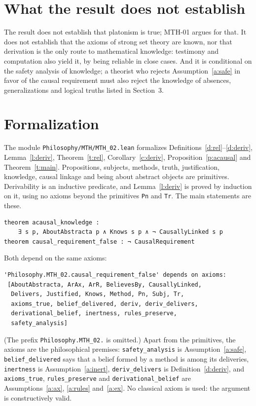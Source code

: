 \documentclass{situationist-preprint}
\begin{document}
\section{What the result does not establish}

The result does not establish that platonism is true; MTH-01 argues for that. It does not establish that the axioms of strong set theory are known, nor that derivation is the only route to mathematical knowledge: testimony and computation also yield it, by being reliable in close cases. And it is conditional on the safety analysis of knowledge; a theorist who rejects Assumption~\ref{a:safe} in favor of the causal requirement must also reject the knowledge of absences, generalizations and logical truths listed in Section~3.

\section{Formalization}

The module \nolinkurl{Philosophy/MTH/MTH_02.lean} formalizes Definitions~\ref{d:rel}--\ref{d:deriv}, Lemma~\ref{l:deriv}, Theorem~\ref{t:rel}, Corollary~\ref{c:deriv}, Proposition~\ref{p:acausal} and Theorem~\ref{t:main}. Propositions, subjects, methods, truth, justification, knowledge, causal linkage and being about abstract objects are primitives. Derivability is an inductive predicate, and Lemma~\ref{l:deriv} is proved by induction on it, using no axioms beyond the primitives \texttt{Pn} and \texttt{Tr}. The main statements are these.

\begin{lstlisting}
theorem acausal_knowledge :
    ∃ s p, AboutAbstracta p ∧ Knows s p ∧ ¬ CausallyLinked s p
theorem causal_requirement_false : ¬ CausalRequirement
\end{lstlisting}

Both depend on the same axioms:

\begin{lstlisting}
'Philosophy.MTH_02.causal_requirement_false' depends on axioms:
 [AboutAbstracta, ArAx, ArR, BelievesBy, CausallyLinked,
  Delivers, Justified, Knows, Method, Pn, Subj, Tr,
  axioms_true, belief_delivered, deriv, deriv_delivers,
  derivational_belief, inertness, rules_preserve,
  safety_analysis]
\end{lstlisting}

(The prefix \texttt{Philosophy.MTH\_02.} is omitted.) Apart from the primitives, the axioms are the philosophical premises: \texttt{safety\_analysis} is Assumption~\ref{a:safe}, \texttt{belief\_delivered} says that a belief formed by a method is among its deliveries, \texttt{inertness} is Assumption~\ref{a:inert}, \texttt{deriv\_delivers} is Definition~\ref{d:deriv}, and \texttt{axioms\_true}, \texttt{rules\_preserve} and \texttt{derivational\_belief} are Assumptions~\ref{a:ax}, \ref{a:rules} and~\ref{a:ex}. No classical axiom is used: the argument is constructively valid.
\end{document}
